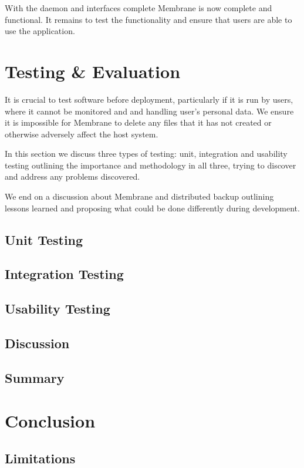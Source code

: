 \documentclass[11pt, a4paper, twocolumn, twoside]{report}
\begin{document}
With the daemon and interfaces complete Membrane is now complete and functional. It remains to test the functionality and ensure that users are able to use the application.

\chapter{Testing \& Evaluation}

It is crucial to test software before deployment, particularly if it is run by users, where it cannot be monitored and and handling user's personal data. We ensure it is impossible for Membrane to delete any files that it has not created or otherwise adversely affect the host system.

In this section we discuss three types of testing: unit, integration and usability testing outlining the importance and methodology in all three, trying to discover and address any problems discovered.

We end on a discussion about Membrane and distributed backup outlining lessons learned and proposing what could be done differently during development.

\section{Unit Testing}

\section{Integration Testing}

\section{Usability Testing}

\section{Discussion}

\section{Summary}

\chapter{Conclusion}

\section{Limitations}
\end{document}
